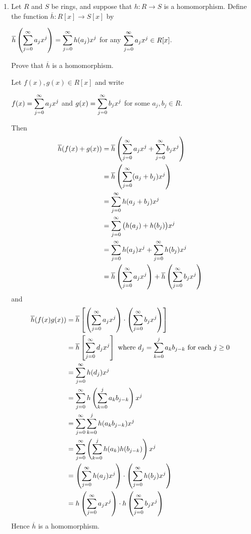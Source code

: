 \documentclass[11pt,fleqn,dvipsnames,usenames]{article}
\begin{document}
\begin{enumerate}[1.]
\item Let $R$ and $S$ be rings, and suppose that $h:R\to S$ is a homomorphism.  Define the function $\overline{h}:R[x]\to S[x]$ by
\begin{center}
$\overline{h}\left(\displaystyle\sum\limits_{j=0}^{\infty}a_{j}x^{j}\right) = \displaystyle\sum\limits_{j=0}^{\infty}h(a_{j})x^{j}$ for any $\displaystyle\sum\limits_{j=0}^{\infty}a_{j}x^{j}\in R[x]$.
\end{center}
Prove that $\overline{h}$ is a homomorphism.
\vsmsp

\solution Let $f(x),g(x)\in R[x]$ and write
\begin{center}
$f(x) = \displaystyle\sum\limits_{j=0}^{\infty}a_{j}x^{j}$ and $g(x) = \displaystyle\sum\limits_{j=0}^{\infty}b_{j}x^{j}$ for some $a_{j},b_{j}\in R$.
\end{center}
Then
\begin{align*}
\overline{h}(f(x) + g(x)) &= \overline{h}\left(\displaystyle\sum\limits_{j=0}^{\infty}a_{j}x^{j} + \displaystyle\sum\limits_{j=0}^{\infty}b_{j}x^{j}\right)\\
&= \overline{h}\left(\displaystyle\sum\limits_{j=0}^{\infty}(a_{j} + b_{j})x^{j}\right)\\
&= \displaystyle\sum\limits_{j=0}^{\infty}h(a_{j} + b_{j})x^{j}\\
&= \displaystyle\sum\limits_{j=0}^{\infty}\big(h(a_{j}) + h(b_{j})\big)x^{j}\\
&= \displaystyle\sum\limits_{j=0}^{\infty}h(a_{j})x^{j} + \displaystyle\sum\limits_{j=0}^{\infty}h(b_{j})x^{j}\\
&= \overline{h}\left(\displaystyle\sum\limits_{j=0}^{\infty}a_{j}x^{j}\right) + \overline{h}\left(\displaystyle\sum\limits_{j=0}^{\infty}b_{j}x^{j}\right)
\end{align*}
and
\begin{align*}
\overline{h}(f(x)g(x)) &= \overline{h}\left[\left(\displaystyle\sum\limits_{j=0}^{\infty}a_{j}x^{j}\right) \cdot \left(\displaystyle\sum\limits_{j=0}^{\infty}b_{j}x^{j}\right)\right]\\
&= \overline{h}\left[\displaystyle\sum\limits_{j=0}^{\infty}d_{j}x^{j}\right]\text{ where }d_{j} = \displaystyle\sum\limits_{k=0}^{j}a_{k}b_{j-k}\text{ for each }j\geq 0\\
&= \displaystyle\sum\limits_{j=0}^{\infty}h(d_{j})x^{j}\\
&= \displaystyle\sum\limits_{j=0}^{\infty}h\left(\displaystyle\sum\limits_{k=0}^{j}a_{k}b_{j-k}\right)x^{j}\\
&= \displaystyle\sum\limits_{j=0}^{\infty}\displaystyle\sum\limits_{k=0}^{j}h(a_{k}b_{j-k})x^{j}\\
&= \displaystyle\sum\limits_{j=0}^{\infty}\left(\displaystyle\sum\limits_{k=0}^{j}h(a_{k})h(b_{j-k})\right)x^{j}\\
&= \left(\displaystyle\sum\limits_{j=0}^{\infty}h(a_{j})x^{j}\right)\cdot \left(\displaystyle\sum\limits_{j=0}^{\infty}h(b_{j})x^{j}\right)\\
&= h\left(\displaystyle\sum\limits_{j=0}^{\infty}a_{j}x^{j}\right)\cdot h\left(\displaystyle\sum\limits_{j=0}^{\infty}b_{j}x^{j}\right)
\end{align*}
Hence $\overline{h}$ is a homomorphism.


\end{enumerate}
\end{document}
